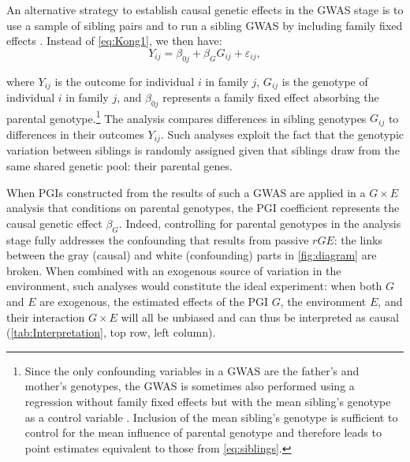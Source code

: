 \documentclass[12pt,a4paper]{article}
\begin{document}
\begin{bibunit}
An alternative strategy to establish causal genetic effects in the GWAS stage is to use a sample of sibling pairs and to run a sibling GWAS by including family fixed effects \citep{Howe2022}. Instead of \autoref{eq:Kong1}, we then have:
\vspace{-3mm}
\begin{equation}
Y_{ij} = \beta_{0j} + \beta_G G_{ij} + \varepsilon_{ij} ,
\label{eq:siblings}
\end{equation}
\vspace{-9mm}

\noindent where $Y_{ij}$ is the outcome for individual $i$ in family $j$, $G_{ij}$ is the genotype of individual $i$ in family $j$, and $\beta_{0j}$ represents a family fixed effect absorbing the parental genotype.\footnote{Since the only confounding variables in a GWAS are the father's and mother's genotypes, the GWAS is sometimes also performed using a regression without family fixed effects but with the mean sibling's genotype as a control variable \citep[e.g.,][]{Howe2022}. Inclusion of the mean sibling's genotype is sufficient to control for the mean influence of parental genotype and therefore leads to point estimates equivalent to those from \autoref{eq:siblings}.} 
The analysis compares differences in sibling genotypes $G_{ij}$ to differences in their outcomes $Y_{ij}$. Such analyses exploit the fact that the genotypic variation between siblings is randomly assigned given that siblings draw from the same shared genetic pool: their parental genes. 

When PGIs constructed from the results of such a GWAS are applied in a $G \times E$ analysis that conditions on parental genotypes, the PGI coefficient represents the causal genetic effect $\beta_G$. Indeed, controlling for parental genotypes in the analysis stage fully addresses the confounding that results from passive $rGE$: the links between the gray (causal) and white (confounding) parts in \autoref{fig:diagram} are broken. When combined with an exogenous source of variation in the environment, such analyses would constitute the ideal experiment: when both $G$ and $E$ are exogenous, the estimated effects of the PGI $G$, the environment $E$, and their interaction $G\times E$ will all be unbiased and can thus be interpreted as causal (\autoref{tab:Interpretation}, top row, left column).


\end{bibunit}
\end{document}
